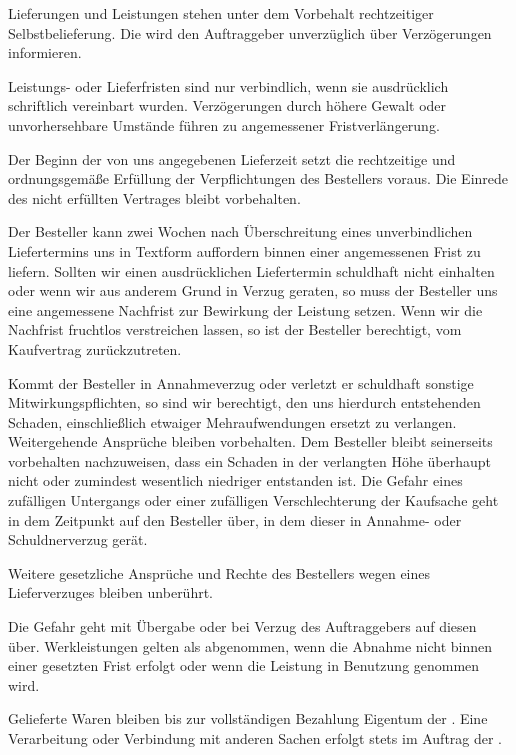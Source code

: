 \documentclass[fontsize=12pt,parskip=half]{scrartcl}
\begin{document}
\begin{contract}

\Clause[title={Termine}]

Lieferungen und Leistungen stehen unter dem Vorbehalt rechtzeitiger Selbstbelieferung. Die \companyName{} wird den Auftraggeber unverzüglich über Verzögerungen informieren. 

Leistungs- oder Lieferfristen sind nur verbindlich, wenn sie ausdrücklich schriftlich vereinbart wurden. Verzögerungen durch höhere Gewalt oder unvorhersehbare Umstände führen zu angemessener Fristverlängerung.

Der Beginn der von uns angegebenen Lieferzeit setzt die rechtzeitige und ordnungsgemäße Erfüllung der Verpflichtungen des Bestellers voraus. Die Einrede des nicht erfüllten Vertrages bleibt vorbehalten.

Der Besteller kann zwei Wochen nach Überschreitung eines unverbindlichen Liefertermins uns in Textform auffordern binnen einer angemessenen Frist zu liefern. Sollten wir einen ausdrücklichen Liefertermin schuldhaft nicht einhalten oder wenn wir aus anderem Grund in Verzug geraten, so muss der Besteller uns eine angemessene Nachfrist zur Bewirkung der Leistung setzen. Wenn wir die Nachfrist fruchtlos verstreichen lassen, so ist der Besteller berechtigt, vom Kaufvertrag zurückzutreten.

Kommt der Besteller in Annahmeverzug oder verletzt er schuldhaft sonstige Mitwirkungspflichten, so sind wir berechtigt, den uns hierdurch entstehenden Schaden, einschließlich etwaiger Mehraufwendungen ersetzt zu verlangen. Weitergehende Ansprüche bleiben vorbehalten. Dem Besteller bleibt seinerseits vorbehalten nachzuweisen, dass ein Schaden in der verlangten Höhe überhaupt nicht oder zumindest wesentlich niedriger entstanden ist. Die Gefahr eines zufälligen Untergangs oder einer zufälligen Verschlechterung der Kaufsache geht in dem Zeitpunkt auf den Besteller über, in dem dieser in Annahme- oder Schuldnerverzug gerät.

Weitere gesetzliche Ansprüche und Rechte des Bestellers wegen eines Lieferverzuges bleiben unberührt.

\Clause[title={Gefahrübergang und Abnahme}]

Die Gefahr geht mit Übergabe oder bei Verzug des Auftraggebers auf diesen über. Werkleistungen gelten als abgenommen, wenn die Abnahme nicht binnen einer gesetzten Frist erfolgt oder wenn die Leistung in Benutzung genommen wird.


\Clause[title={Eigentumsvorbehalt}]

Gelieferte Waren bleiben bis zur vollständigen Bezahlung Eigentum der \companyName{}. Eine Verarbeitung oder Verbindung mit anderen Sachen erfolgt stets im Auftrag der \companyName{}.

\end{contract}
\end{document}

